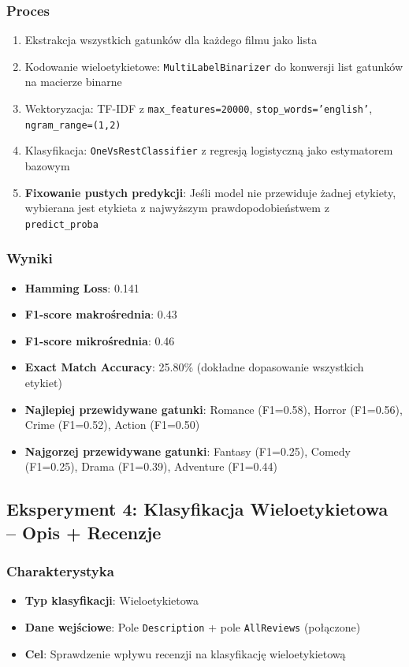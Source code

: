 \documentclass[12pt,a4paper]{article}
\begin{document}
\subsubsection{Proces}
\begin{enumerate}
    \item Ekstrakcja wszystkich gatunków dla każdego filmu jako lista
    \item Kodowanie wieloetykietowe: \texttt{MultiLabelBinarizer} do konwersji list gatunków na macierze binarne
    \item Wektoryzacja: TF-IDF z \texttt{max\_features=20000}, \texttt{stop\_words='english'}, \texttt{ngram\_range=(1,2)}
    \item Klasyfikacja: \texttt{OneVsRestClassifier} z regresją logistyczną jako estymatorem bazowym
    \item \textbf{Fixowanie pustych predykcji}: Jeśli model nie przewiduje żadnej etykiety, wybierana jest etykieta z najwyższym prawdopodobieństwem z \texttt{predict\_proba}
\end{enumerate}

\subsubsection{Wyniki}
\begin{itemize}
    \item \textbf{Hamming Loss}: 0.141
    \item \textbf{F1-score makrośrednia}: 0.43
    \item \textbf{F1-score mikrośrednia}: 0.46
    \item \textbf{Exact Match Accuracy}: 25.80\% (dokładne dopasowanie wszystkich etykiet)
    \item \textbf{Najlepiej przewidywane gatunki}: Romance (F1=0.58), Horror (F1=0.56), Crime (F1=0.52), Action (F1=0.50)
    \item \textbf{Najgorzej przewidywane gatunki}: Fantasy (F1=0.25), Comedy (F1=0.25), Drama (F1=0.39), Adventure (F1=0.44)
\end{itemize}

\subsection{Eksperyment 4: Klasyfikacja Wieloetykietowa -- Opis + Recenzje}

\subsubsection{Charakterystyka}
\begin{itemize}
    \item \textbf{Typ klasyfikacji}: Wieloetykietowa
    \item \textbf{Dane wejściowe}: Pole \texttt{Description} + pole \texttt{AllReviews} (połączone)
    \item \textbf{Cel}: Sprawdzenie wpływu recenzji na klasyfikację wieloetykietową
\end{itemize}
\end{document}
